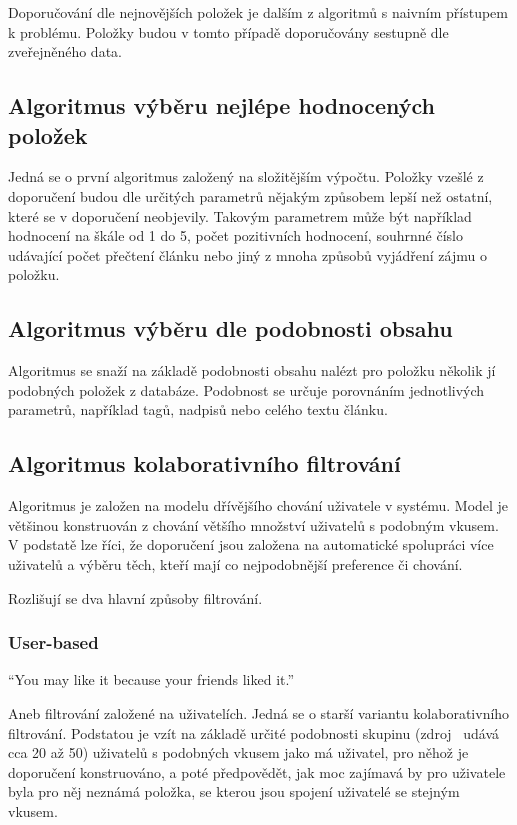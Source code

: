 \documentclass[thesis=M,czech]{FITthesis}[2014/05/07]
\begin{document}
Doporučování dle nejnovějších položek je dalším z algoritmů s naivním přístupem k problému. Položky budou v tomto případě doporučovány sestupně dle zveřejněného data. 

\subsection{Algoritmus výběru nejlépe hodnocených položek}

Jedná se o první algoritmus založený na složitějším výpočtu. Položky vzešlé z doporučení budou dle určitých parametrů nějakým způsobem lepší než ostatní, které se v doporučení neobjevily. Takovým parametrem může být například hodnocení na škále od 1 do 5, počet pozitivních hodnocení, souhrnné číslo udávající počet přečtení článku nebo jiný z mnoha způsobů vyjádření zájmu o položku. 

\subsection{Algoritmus výběru dle podobnosti obsahu}

Algoritmus se snaží na základě podobnosti obsahu nalézt pro položku několik jí podobných položek z databáze. Podobnost se určuje porovnáním jednotlivých parametrů, například tagů, nadpisů nebo celého textu článku.

\subsection{Algoritmus kolaborativního filtrování}

Algoritmus je založen na modelu dřívějšího chování uživatele v systému. Model je většinou konstruován z chování většího množství uživatelů s podobným vkusem. V podstatě lze říci, že doporučení jsou založena na automatické spolupráci více uživatelů a výběru těch, kteří mají co nejpodobnější preference či chování.

Rozlišují se dva hlavní způsoby filtrování.

\subsubsection{User-based}

``You may like it because your friends liked it.''~\cite{cf}

Aneb filtrování založené na uživatelích. Jedná se o starší variantu kolaborativního filtrování. Podstatou je vzít na základě určité podobnosti skupinu (zdroj~\cite{cf} udává cca 20 až 50) uživatelů s podobných vkusem jako má uživatel, pro něhož je doporučení konstruováno, a poté předpovědět, jak moc zajímavá by pro uživatele byla pro něj neznámá položka, se kterou jsou spojení uživatelé se stejným vkusem.
\end{document}
